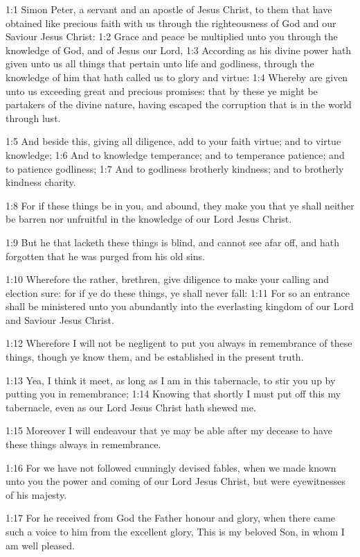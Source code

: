 

1:1 Simon Peter, a servant and an apostle of Jesus Christ, to them
that have obtained like precious faith with us through the
righteousness of God and our Saviour Jesus Christ: 1:2 Grace and peace
be multiplied unto you through the knowledge of God, and of Jesus our
Lord, 1:3 According as his divine power hath given unto us all things
that pertain unto life and godliness, through the knowledge of him
that hath called us to glory and virtue: 1:4 Whereby are given unto us
exceeding great and precious promises: that by these ye might be
partakers of the divine nature, having escaped the corruption that is
in the world through lust.

1:5 And beside this, giving all diligence, add to your faith virtue;
and to virtue knowledge; 1:6 And to knowledge temperance; and to
temperance patience; and to patience godliness; 1:7 And to godliness
brotherly kindness; and to brotherly kindness charity.

1:8 For if these things be in you, and abound, they make you that ye
shall neither be barren nor unfruitful in the knowledge of our Lord
Jesus Christ.

1:9 But he that lacketh these things is blind, and cannot see afar
off, and hath forgotten that he was purged from his old sins.

1:10 Wherefore the rather, brethren, give diligence to make your
calling and election sure: for if ye do these things, ye shall never
fall: 1:11 For so an entrance shall be ministered unto you abundantly
into the everlasting kingdom of our Lord and Saviour Jesus Christ.

1:12 Wherefore I will not be negligent to put you always in
remembrance of these things, though ye know them, and be established
in the present truth.

1:13 Yea, I think it meet, as long as I am in this tabernacle, to stir
you up by putting you in remembrance; 1:14 Knowing that shortly I must
put off this my tabernacle, even as our Lord Jesus Christ hath shewed
me.

1:15 Moreover I will endeavour that ye may be able after my decease to
have these things always in remembrance.

1:16 For we have not followed cunningly devised fables, when we made
known unto you the power and coming of our Lord Jesus Christ, but were
eyewitnesses of his majesty.

1:17 For he received from God the Father honour and glory, when there
came such a voice to him from the excellent glory, This is my beloved
Son, in whom I am well pleased.

